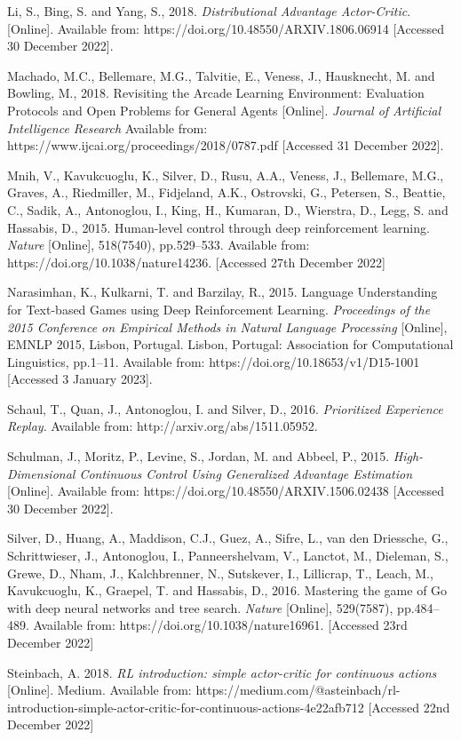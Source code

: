 \documentclass{article}
\begin{document}
Li, S., Bing, S. and Yang, S., 2018. \emph{Distributional Advantage Actor-Critic}. [Online]. Available from: https://doi.org/10.48550/ARXIV.1806.06914 [Accessed 30 December 2022].

Machado, M.C., Bellemare, M.G., Talvitie, E., Veness, J., Hausknecht, M. and Bowling, M., 2018. Revisiting the Arcade Learning Environment: Evaluation Protocols and Open Problems for General Agents [Online]. \emph{Journal of Artificial Intelligence Research}  Available from: https://www.ijcai.org/proceedings/2018/0787.pdf  [Accessed 31 December 2022].

Mnih, V., Kavukcuoglu, K., Silver, D., Rusu, A.A., Veness, J., Bellemare, M.G., Graves, A., Riedmiller, M., Fidjeland, A.K., Ostrovski, G., Petersen, S., Beattie, C., Sadik, A., Antonoglou, I., King, H., Kumaran, D., Wierstra, D., Legg, S. and Hassabis, D., 2015. Human-level control through deep reinforcement learning. \emph{Nature} [Online], 518(7540), pp.529–533. Available from: https://doi.org/10.1038/nature14236. [Accessed 27th December 2022]

Narasimhan, K., Kulkarni, T. and Barzilay, R., 2015. Language Understanding for Text-based Games using Deep Reinforcement Learning. \emph{Proceedings of the 2015 Conference on Empirical Methods in Natural Language Processing} [Online], EMNLP 2015, Lisbon, Portugal. Lisbon, Portugal: Association for Computational Linguistics, pp.1–11. Available from: https://doi.org/10.18653/v1/D15-1001 [Accessed 3 January 2023].

Schaul, T., Quan, J., Antonoglou, I. and Silver, D., 2016. \emph{Prioritized Experience Replay}. Available from: http://arxiv.org/abs/1511.05952.

Schulman, J., Moritz, P., Levine, S., Jordan, M. and Abbeel, P., 2015. \emph{High-Dimensional Continuous Control Using Generalized Advantage Estimation}  [Online]. Available from: https://doi.org/10.48550/ARXIV.1506.02438 [Accessed 30 December 2022].

Silver, D., Huang, A., Maddison, C.J., Guez, A., Sifre, L., van den Driessche, G., Schrittwieser, J., Antonoglou, I., Panneershelvam, V., Lanctot, M., Dieleman, S., Grewe, D., Nham, J., Kalchbrenner, N., Sutskever, I., Lillicrap, T., Leach, M., Kavukcuoglu, K., Graepel, T. and Hassabis, D., 2016. Mastering the game of Go with deep neural networks and tree search. \emph{Nature} [Online], 529(7587), pp.484–489. Available from: https://doi.org/10.1038/nature16961. [Accessed 23rd December 2022]

Steinbach, A. 2018. \emph{RL introduction: simple actor-critic for continuous actions} [Online]. Medium. Available from: https://medium.com/@asteinbach/rl-introduction-simple-actor-critic-for-continuous-actions-4e22afb712 [Accessed 22nd December 2022]
\end{document}
